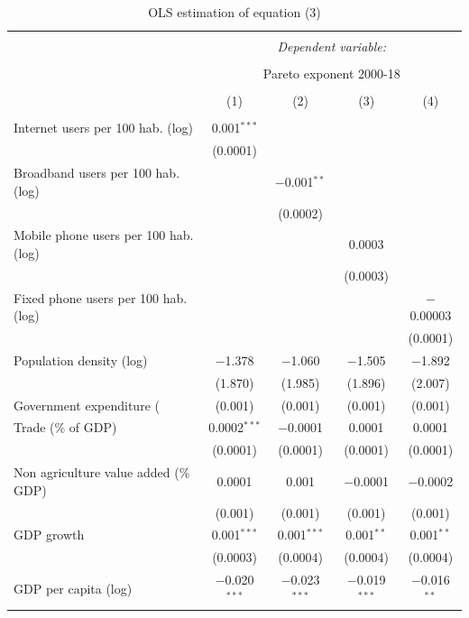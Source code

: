 \documentclass[10pt,letterpaper]{article}
\begin{document}
\begin{table}[!htbp] \centering 
  \caption{OLS estimation of equation (3)\label{ols.global}} 
  \label{} 
\small 
\begin{tabular}{@{\extracolsep{1pt}}lcccc} 
\\[-1.8ex]\hline 
\hline \\[-1.8ex] 
 & \multicolumn{4}{c}{\textit{Dependent variable:}} \\ 
\cline{2-5} 
\\[-1.8ex] & \multicolumn{4}{c}{Pareto exponent 2000-18} \\ 
\\[-1.8ex] & (1) & (2) & (3) & (4)\\ 
\hline \\[-1.8ex] 
 Internet users per 100 hab. (log) & 0.001$^{***}$ &  &  &  \\ 
  & (0.0001) &  &  &  \\ 
  Broadband users per 100 hab. (log) &  & $-$0.001$^{**}$ &  &  \\ 
  &  & (0.0002) &  &  \\ 
  Mobile phone users per 100 hab. (log) &  &  & 0.0003 &  \\ 
  &  &  & (0.0003) &  \\ 
  Fixed phone users per 100 hab. (log) &  &  &  & $-$0.00003 \\ 
  &  &  &  & (0.0001) \\ 
  Population density (log) & $-$1.378 & $-$1.060 & $-$1.505 & $-$1.892 \\ 
  & (1.870) & (1.985) & (1.896) & (2.007) \\ 
  Government expenditure (%
  & (0.001) & (0.001) & (0.001) & (0.001) \\ 
  Trade (\% of GDP) & 0.0002$^{***}$ & $-$0.0001 & 0.0001 & 0.0001 \\ 
  & (0.0001) & (0.0001) & (0.0001) & (0.0001) \\ 
  Non agriculture value added (\% GDP) & 0.0001 & 0.001 & $-$0.0001 & $-$0.0002 \\ 
  & (0.001) & (0.001) & (0.001) & (0.001) \\ 
  GDP growth & 0.001$^{***}$ & 0.001$^{***}$ & 0.001$^{**}$ & 0.001$^{**}$ \\ 
  & (0.0003) & (0.0004) & (0.0004) & (0.0004) \\ 
  GDP per capita (log) & $-$0.020$^{***}$ & $-$0.023$^{***}$ & $-$0.019$^{***}$ & $-$0.016$^{**}$ \\ 

\end{tabular}
\end{table}
\end{document}
